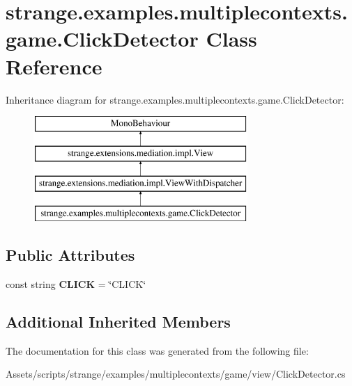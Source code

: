 \hypertarget{classstrange_1_1examples_1_1multiplecontexts_1_1game_1_1_click_detector}{\section{strange.\-examples.\-multiplecontexts.\-game.\-Click\-Detector Class Reference}
\label{classstrange_1_1examples_1_1multiplecontexts_1_1game_1_1_click_detector}
}
Inheritance diagram for strange.\-examples.\-multiplecontexts.\-game.\-Click\-Detector\-:\begin{figure}[H]
\begin{center}
\leavevmode
\includegraphics[height=4.000000cm]{classstrange_1_1examples_1_1multiplecontexts_1_1game_1_1_click_detector}
\end{center}
\end{figure}
\subsection*{Public Attributes}
\begin{DoxyCompactItemize}
\item 
\hypertarget{classstrange_1_1examples_1_1multiplecontexts_1_1game_1_1_click_detector_a4704e6850a755f02dba728f8eda4425b}{const string {\bfseries C\-L\-I\-C\-K} = \char`\"{}C\-L\-I\-C\-K\char`\"{}}\label{classstrange_1_1examples_1_1multiplecontexts_1_1game_1_1_click_detector_a4704e6850a755f02dba728f8eda4425b}

\end{DoxyCompactItemize}
\subsection*{Additional Inherited Members}


The documentation for this class was generated from the following file\-:\begin{DoxyCompactItemize}
\item 
Assets/scripts/strange/examples/multiplecontexts/game/view/Click\-Detector.\-cs\end{DoxyCompactItemize}
